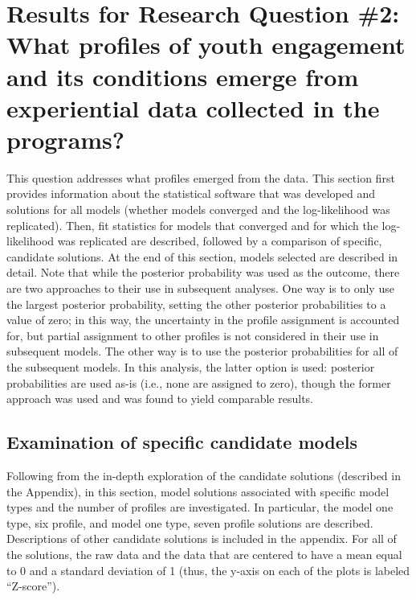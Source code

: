 \documentclass[]{book}
\theoremstyle{definition}
\theoremstyle{definition}
\theoremstyle{definition}
\theoremstyle{remark}
\begin{document}
\section{Results for Research Question \#2: What profiles of youth
engagement and its conditions emerge from experiential data collected in
the
programs?}\label{results-for-research-question-2-what-profiles-of-youth-engagement-and-its-conditions-emerge-from-experiential-data-collected-in-the-programs}

This question addresses what profiles emerged from the data. This
section first provides information about the statistical software that
was developed and solutions for all models (whether models converged and
the log-likelihood was replicated). Then, fit statistics for models that
converged and for which the log-likelihood was replicated are described,
followed by a comparison of specific, candidate solutions. At the end of
this section, models selected are described in detail. Note that while
the posterior probability was used as the outcome, there are two
approaches to their use in subsequent analyses. One way is to only use
the largest posterior probability, setting the other posterior
probabilities to a value of zero; in this way, the uncertainty in the
profile assignment is accounted for, but partial assignment to other
profiles is not considered in their use in subsequent models. The other
way is to use the posterior probabilities for all of the subsequent
models. In this analysis, the latter option is used: posterior
probabilities are used as-is (i.e., none are assigned to zero), though
the former approach was used and was found to yield comparable results.

\subsection{Examination of specific candidate
models}\label{examination-of-specific-candidate-models}

Following from the in-depth exploration of the candidate solutions
(described in the Appendix), in this section, model solutions associated
with specific model types and the number of profiles are investigated.
In particular, the model one type, six profile, and model one type,
seven profile solutions are described. Descriptions of other candidate
solutions is included in the appendix. For all of the solutions, the raw
data and the data that are centered to have a mean equal to 0 and a
standard deviation of 1 (thus, the y-axis on each of the plots is
labeled ``Z-score'').
\end{document}
